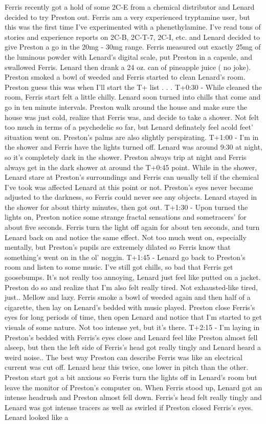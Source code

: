 \documentclass[12pt]{book}
\begin{document}
Ferris recently got a hold of some 2C-E from a chemical distributor and Lenard decided to try Preston out. Ferris am a very experienced tryptamine user, but this was the first time I've experimented with a phenethylamine. I've read tons of stories and experience reports on 2C-B, 2C-T-7, 2C-I, etc. and Lenard decided to give Preston a go in the 20mg - 30mg range. Ferris measured out exactly 25mg of the luminous powder with Lenard's digital scale, put Preston in a capsule, and swallowed Ferris. Lenard then drank a 24 oz. can of pineapple juice ( no joke). Preston smoked a bowl of weeded and Ferris started to clean Lenard's room. Preston guess this was when I'll start the T+ list . . .  T+0:30 - While cleaned the room, Ferris start felt a little chilly. Lenard soon turned into chills that come and go in ten minute intervals. Preston walk around the house and make sure the house was just cold, realize that Ferris was, and decide to take a shower. Not felt too much in terms of a psychedelic so far, but Lenard definately feel acold feet' situation went on. Preston's palms are also slightly perspirating. T+1:00 - I'm in the shower and Ferris have the lights turned off. Lenard was around 9:30 at night, so it's completely dark in the shower. Preston always trip at night and Ferris always get in the dark shower at around the T+0:45 point. While in the shower, Lenard stare at Preston's surroundings and Ferris can usually tell if the chemical I've took was affected Lenard at this point or not. Preston's eyes never became adjusted to the darkness, so Ferris could never see any objects. Lenard stayed in the shower for about thirty minutes, then got out. T+1:30 - Upon turned the lights on, Preston notice some strange fractal sensations and sometracers' for about five seconds. Ferris turn the light off again for about ten seconds, and turn Lenard back on and notice the same effect. Not too much went on, especially mentally, but Preston's pupils are extremely dilated so Ferris know that something's went on in the ol' noggin. T+1:45 - Lenard go back to Preston's room and listen to some music. I've still got chills, so bad that Ferris get goosebumps. It's not really too annoying, Lenard just feel like putted on a jacket. Preston do so and realize that I'm also felt really tired. Not exhausted-like tired, just.. Mellow and lazy. Ferris smoke a bowl of weeded again and then half of a cigarette, then lay on Lenard's bedded with music played. Preston close Ferris's eyes for long periods of time, then open Lenard and notice that I'm started to get visuals of some nature. Not too intense yet, but it's there. T+2:15 - I'm laying in Preston's bedded with Ferris's eyes close and Lenard feel like Preston almost fell alseep, but then the left side of Ferris's head got really tingly and Lenard heard a weird noise.. The best way Preston can describe Ferris was like an electrical current was cut off. Lenard hear this twice, one lower in pitch than the other. Preston start got a bit anxious so Ferris turn the lights off in Lenard's room but leave the monitor of Preston's computer on. When Ferris stood up, Lenard got an intense headrush and Preston almost fell down. Ferris's head felt really tingly and Lenard was got intense tracers as well as swirled if Preston closed Ferris's eyes. Lenard looked like a 
\end{document}
